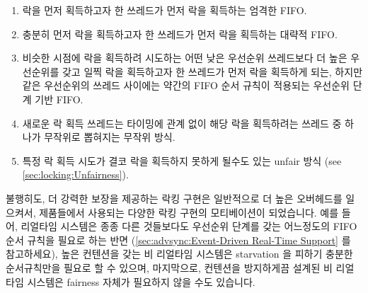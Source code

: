 \begin{enumerate}
\item	락을 먼저 획득하고자 한 쓰레드가 먼저 락을 획득하는 엄격한 FIFO.
\item	충분히 먼저 락을 획득하고자 한 쓰레드가 먼저 락을 획득하는 대략적 FIFO.
\item	비슷한 시점에 락을 획득하려 시도하는 어떤 낮은 우선순위 쓰레드보다 더
	높은 우선순위를 갖고 일찍 락을 획득하고자 한 쓰레드가 먼저 락을
	획득하게 되는, 하지만 같은 우선순위의 쓰레드 사이에는 약간의 FIFO 순서
	규칙이 적용되는 우선순위 단계 기반 FIFO.
\item	새로운 락 획득 쓰레드는 타이밍에 관계 없이 해당 락을 획득하려는 쓰레드
	중 하나가 무작위로 뽑혀지는 무작위 방식.
\item	특정 락 획득 시도가 결코 락을 획득하지 못하게 될수도 있는 unfair 방식
	(see \cref{sec:locking:Unfairness}).

\end{enumerate}

불행히도, 더 강력한 보장을 제공하는 락킹 구현은 일반적으로 더 높은 오버헤드를
일으켜서, 제품들에서 사용되는 다양한 락킹 구현의 모티베이션이 되었습니다.
예를 들어, 리얼타임 시스템은 종종 다른 것들보다도 우선순위 단계를 갖는
어느정도의 FIFO 순서 규칙을 필요로 하는 반면
(\cref{sec:advsync:Event-Driven Real-Time Support} 를 참고하세요),
높은 컨텐션을 갖는 비 리얼타임 시스템은 starvation 을 피하기 충분한
순서규칙만을 필요로 할 수 있으며, 마지막으로, 컨텐션을 방지하게끔 설계된 비
리얼타임 시스템은 fairness 자체가 필요하지 않을 수도 있습니다.

